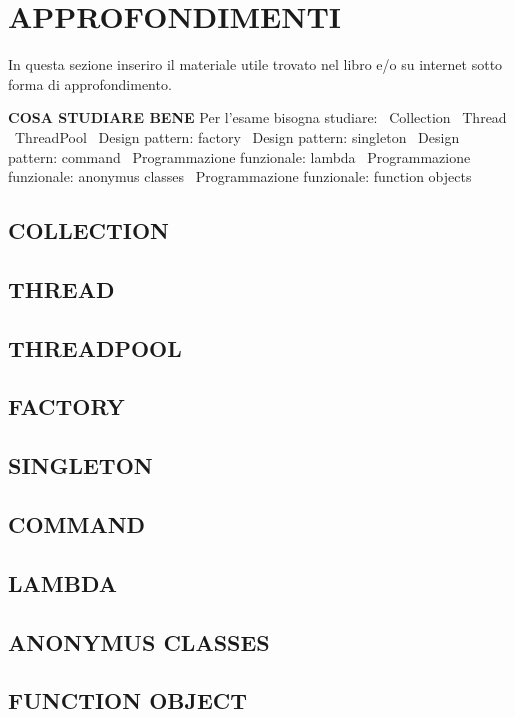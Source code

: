 

\newpage
\section{APPROFONDIMENTI}
In questa sezione inseriro il materiale utile trovato nel libro e/o su internet sotto forma di approfondimento. 


\noindent \textbf{COSA STUDIARE BENE} \newline
Per l'esame bisogna studiare: \newline
\textbullet\ Collection \newline
\textbullet\ Thread \newline
\textbullet\ ThreadPool \newline
\textbullet\ Design pattern: factory \newline
\textbullet\ Design pattern: singleton \newline
\textbullet\ Design pattern: command \newline
\textbullet\ Programmazione funzionale: lambda \newline
\textbullet\ Programmazione funzionale: anonymus classes \newline
\textbullet\ Programmazione funzionale: function objects \newline


\subsection{COLLECTION}

\subsection{THREAD}

\subsection{THREADPOOL}

\subsection{FACTORY}

\subsection{SINGLETON}

\subsection{COMMAND}

\subsection{LAMBDA}

\subsection{ANONYMUS CLASSES}

\subsection{FUNCTION OBJECT}


